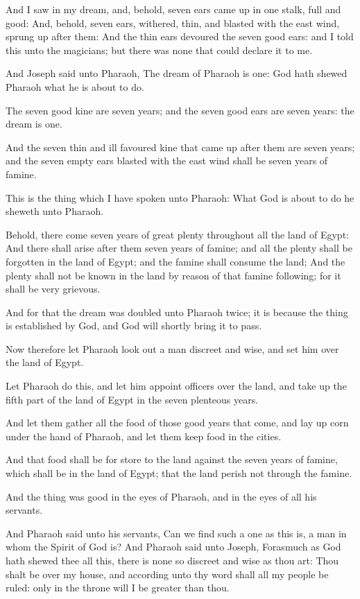 \verse And I saw in my dream, and, behold, seven ears came up in one stalk, full and good: \verse And, behold, seven ears, withered, thin, and blasted with the east wind, sprung up after them: \verse And the thin ears devoured the seven good ears: and I told this unto the magicians; but there was none that could declare it to me.

\verse And Joseph said unto Pharaoh, The dream of Pharaoh is one: God hath shewed Pharaoh what he is about to do.

\verse The seven good kine are seven years; and the seven good ears are seven years: the dream is one.

\verse And the seven thin and ill favoured kine that came up after them are seven years; and the seven empty ears blasted with the east wind shall be seven years of famine.

\verse This is the thing which I have spoken unto Pharaoh: What God is about to do he sheweth unto Pharaoh.

\verse Behold, there come seven years of great plenty throughout all the land of Egypt: \verse And there shall arise after them seven years of famine; and all the plenty shall be forgotten in the land of Egypt; and the famine shall consume the land; \verse And the plenty shall not be known in the land by reason of that famine following; for it shall be very grievous.

\verse And for that the dream was doubled unto Pharaoh twice; it is because the thing is established by God, and God will shortly bring it to pass.

\verse Now therefore let Pharaoh look out a man discreet and wise, and set him over the land of Egypt.

\verse Let Pharaoh do this, and let him appoint officers over the land, and take up the fifth part of the land of Egypt in the seven plenteous years.

\verse And let them gather all the food of those good years that come, and lay up corn under the hand of Pharaoh, and let them keep food in the cities.

\verse And that food shall be for store to the land against the seven years of famine, which shall be in the land of Egypt; that the land perish not through the famine.

\verse And the thing was good in the eyes of Pharaoh, and in the eyes of all his servants.

\verse And Pharaoh said unto his servants, Can we find such a one as this is, a man in whom the Spirit of God is?  \verse And Pharaoh said unto Joseph, Forasmuch as God hath shewed thee all this, there is none so discreet and wise as thou art: \verse Thou shalt be over my house, and according unto thy word shall all my people be ruled: only in the throne will I be greater than thou.

